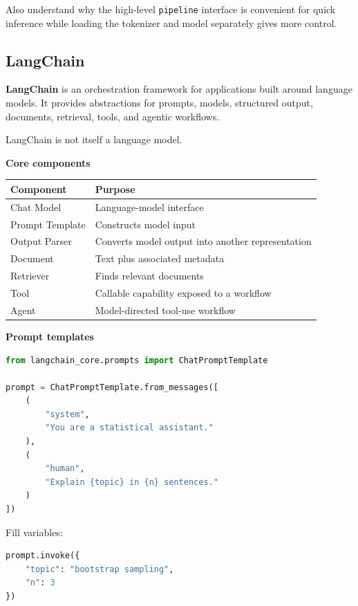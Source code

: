 \documentclass[11pt,letterpaper]{article}
\begin{document}
Also understand why the high-level \texttt{pipeline} interface is convenient
for quick inference while loading the tokenizer and model separately gives
more control.



\subsection{LangChain}

\textbf{LangChain} is an orchestration framework for applications built around
language models. It provides abstractions for prompts, models, structured
output, documents, retrieval, tools, and agentic workflows.

LangChain is not itself a language model.

\textbf{Core components}

\begin{center}
\begin{tabularx}{\textwidth}{lX}
\toprule
Component & Purpose \\
\midrule
Chat Model & Language-model interface \\
Prompt Template & Constructs model input \\
Output Parser & Converts model output into another representation \\
Document & Text plus associated metadata \\
Retriever & Finds relevant documents \\
Tool & Callable capability exposed to a workflow \\
Agent & Model-directed tool-use workflow \\
\bottomrule
\end{tabularx}
\end{center}

\textbf{Prompt templates}

\begin{lstlisting}[language=Python]
from langchain_core.prompts import ChatPromptTemplate

prompt = ChatPromptTemplate.from_messages([
    (
        "system",
        "You are a statistical assistant."
    ),
    (
        "human",
        "Explain {topic} in {n} sentences."
    )
])
\end{lstlisting}

Fill variables:

\begin{lstlisting}[language=Python]
prompt.invoke({
    "topic": "bootstrap sampling",
    "n": 3
})
\end{lstlisting}
\end{document}
